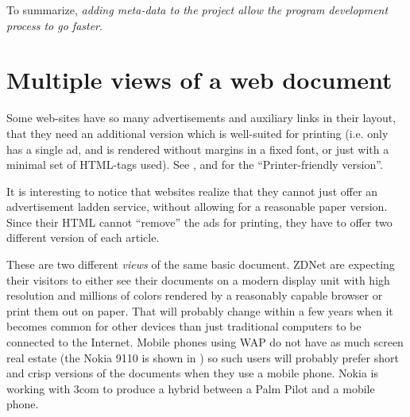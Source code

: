 To summarize, \textit{adding meta-data to the project allow the program
development process to go faster}.


\section{Multiple views of a web document}
\label{sec:multiple-views-of-a-web-document}

 

Some web-sites have so many advertisements and auxiliary links in
their layout, that they need an additional version which is
well-suited for printing (i.e. only has a single ad, and is
rendered without margins in a fixed font, or just with a
minimal set of HTML-tags used).  See
, and  for the
``Printer-friendly version''.

It is interesting to notice that websites realize that they cannot
just offer an advertisement ladden service, without allowing for a
reasonable paper version.  Since their HTML cannot ``remove'' the ads
for printing, they have to offer two different version of each
article.


These are two different \textit{views} of the same basic
document.  ZDNet are expecting their visitors to either see
their documents on a modern display unit with high
resolution and millions of colors rendered by a reasonably
capable browser or print them out on paper.  That will
probably change within a few years when it becomes common
for other devices than just traditional computers to be
connected to the Internet.  Mobile phones using WAP do not
have as much screen real estate (the Nokia 9110 is shown in
) so such users will probably prefer
short and crisp versions of the documents when they use a
mobile phone.  Nokia is working with 3com to produce a
hybrid between a Palm Pilot and a mobile phone.

